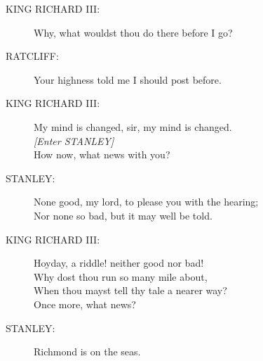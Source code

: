 \documentclass{article}
\begin{document}
\begin{description}
\item[KING RICHARD III:] 
\hspace{1pt}Why, what wouldst thou do there before I go?\\
\end{description}
\begin{description}
\item[RATCLIFF:] 
\hspace{1pt}Your highness told me I should post before.\\
\end{description}
\begin{description}
\item[KING RICHARD III:] 
\hspace{1pt}My mind is changed, sir, my mind is changed.\\
{\it [Enter STANLEY]}\\
\hspace{1pt}How now, what news with you?\\
\end{description}
\begin{description}
\item[STANLEY:] 
\hspace{1pt}None good, my lord, to please you with the hearing;\\
\hspace{1pt}Nor none so bad, but it may well be told.\\
\end{description}
\begin{description}
\item[KING RICHARD III:] 
\hspace{1pt}Hoyday, a riddle! neither good nor bad!\\
\hspace{1pt}Why dost thou run so many mile about,\\
\hspace{1pt}When thou mayst tell thy tale a nearer way?\\
\hspace{1pt}Once more, what news?\\
\end{description}
\begin{description}
\item[STANLEY:] 
\hspace{1pt}Richmond is on the seas.\\
\end{description}
\end{document}
